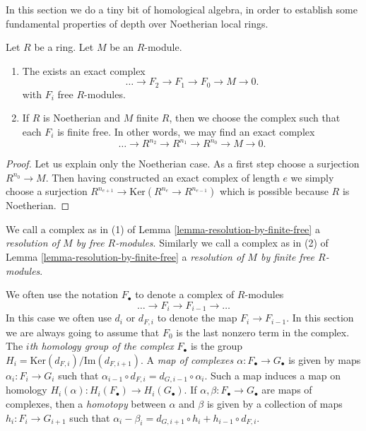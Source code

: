 \noindent
In this section we do a tiny bit of homological algebra,
in order to establish some fundamental properties of
depth over Noetherian local rings.

\begin{lemma}
\label{lemma-resolution-by-finite-free}
Let $R$ be a ring. Let $M$ be an $R$-module.
\begin{enumerate}
\item The exists an exact complex
$$
\ldots \to F_2 \to F_1 \to F_0 \to M \to 0.
$$
with $F_i$ free $R$-modules.
\item If $R$ is Noetherian and $M$ finite $R$, then we
choose the complex such that each $F_i$ is finite free.
In other words, we may find an exact complex
$$
\ldots \to R^{n_2} \to R^{n_1} \to R^{n_0} \to M \to 0.
$$
\end{enumerate}
\end{lemma}

\begin{proof}
Let us explain only the Noetherian case.
As a first step choose a surjection $R^{n_0} \to M$.
Then having constructed an exact complex of length
$e$ we simply choose a surjection $R^{n_{e+1}} \to 
\text{Ker}(R^{n_e} \to R^{n_{e-1}})$ which is possible
because $R$ is Noetherian.
\end{proof}

\begin{definition}
\label{definition-finite-free-resolution}
We call a complex as in (1) of
Lemma \ref{lemma-resolution-by-finite-free}
a {\it resolution of $M$ by free $R$-modules}.
Similarly we call a complex as in (2) of
Lemma \ref{lemma-resolution-by-finite-free}
a {\it resolution of $M$ by finite free $R$-modules}.
\end{definition}

\noindent
We often use the notation $F_{\bullet}$ to denote a complex
of $R$-modules
$$
\ldots \to F_i \to F_{i-1} \to \ldots
$$
In this case we often use $d_i$ or $d_{F, i}$ to denote the map
$F_i \to F_{i-1}$. In this section we are always going to
assume that $F_0$ is the last nonzero term in the complex.
The {\it $i$th homology group of the complex} $F_{\bullet}$
is the group $H_i = \text{Ker}(d_{F,i})/\text{Im}(d_{F,i+1})$.
A {\it map of complexes $\alpha : F_{\bullet} \to G_{\bullet}$}
is given by maps $\alpha_i : F_i \to G_i$ such that
$\alpha_{i-1} \circ d_{F, i} = d_{G, i-1} \circ \alpha_i$.
Such a map induces a map on homology $H_i(\alpha) :
H_i(F_{\bullet}) \to H_i(G_{\bullet})$. If $\alpha, \beta
:  F_{\bullet} \to G_{\bullet}$ are maps of complexes, then
a {\it homotopy} between $\alpha$ and $\beta$ is given by
a collection of maps $h_i : F_i \to G_{i+1}$ such that
$\alpha_i - \beta_i = d_{G, i+1} \circ h_i +
h_{i-1} \circ d_{F, i}$.

